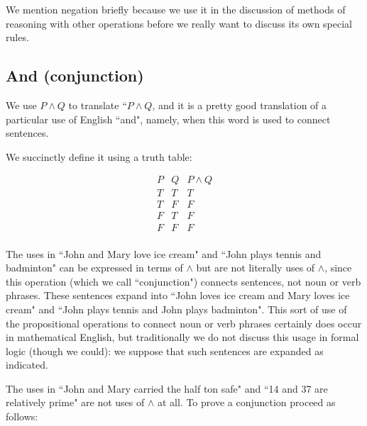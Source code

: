 \documentclass[12pt]{article}
\begin{document}
We mention negation briefly because we use it in the discussion of methods of reasoning with other operations before we really want to discuss its own special rules.

\subsection{And (conjunction)}

We use $P \wedge Q$ to translate ``$P \wedge Q$, and it is a pretty good translation of a particular use of English ``and", namely, when this word is used to connect sentences.

We succinctly define it using a truth table:

$$\begin{array}{cc|c}
P & Q & P \wedge Q \\ \hline
T & T & T \\
T & F & F \\
F & T & F \\
F & F & F \\
\end{array}$$

The uses in ``John and Mary love ice cream" and ``John plays tennis and badminton" can be expressed in terms of $\wedge$ but are not literally uses of $\wedge$, since this operation (which we call ``conjunction") connects sentences, not noun or verb phrases.  These sentences expand into ``John loves ice cream and Mary loves ice cream" and ``John plays tennis and John plays badminton".  This sort of use of the propositional operations to connect noun or verb phrases certainly does occur in mathematical English, but traditionally we do not discuss this usage in formal logic (though we could):  we suppose that such sentences are expanded as indicated.

The uses in ``John and Mary carried the half ton safe" and ``14 and 37 are relatively prime" are not uses of $\wedge$ at all.
\newpage
To prove a conjunction proceed as follows:
\end{document}
